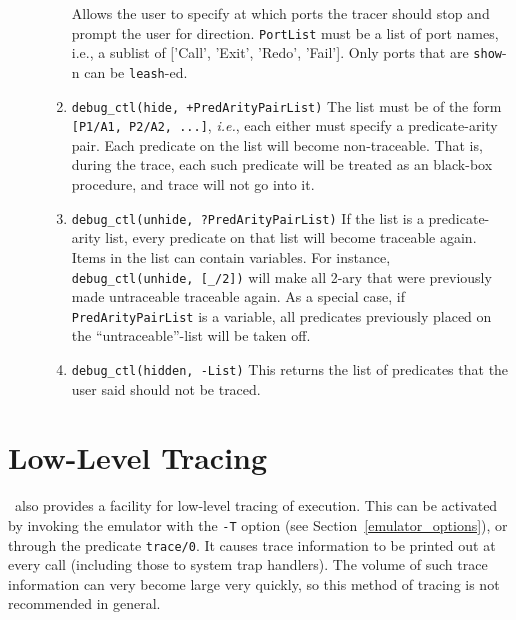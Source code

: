 \begin{description}
\begin{enumerate}
      Allows the user to specify at which ports the tracer should stop
      and prompt the user for direction.  {\tt PortList} must be a list of
      port names, i.e., a sublist of ['Call', 'Exit', 'Redo', 'Fail'].  Only
      ports that are {\tt show}-n can be {\tt leash}-ed. 
    \item {\tt debug\_ctl(hide, +PredArityPairList)}  
      The list must be of the form {\tt [P1/A1, P2/A2, ...]}, {\it i.e.},
      each either must specify a predicate-arity pair. Each predicate on
      the list will become non-traceable. That is, during the trace, each
      such predicate will be treated as an black-box procedure, and trace
      will not go into it.
    \item {\tt debug\_ctl(unhide, ?PredArityPairList)} If the list is a
      predicate-arity list, every predicate on that list will become
      traceable again. Items in the list can contain variables. For
      instance, {\tt debug\_ctl(unhide, [\_/2])} will make all 2-ary that
      were previously made untraceable traceable again.  As a special case,
      if {\tt PredArityPairList} is a variable, all predicates previously
      placed on the ``untraceable''-list will be taken off.
    \item {\tt debug\_ctl(hidden, -List)}
      This returns the list of predicates that the user said should not be
      traced.
   \end{enumerate}
\end{description}


\section{Low-Level Tracing}
 

\ourprolog\ also provides a facility for low-level tracing of execution.
This can be activated by invoking the emulator with the {\tt -T} option
(see Section~\ref{emulator_options}), or through the predicate {\tt trace/0}.
It causes trace information to be printed out at every call (including
those to system trap handlers).  The volume of such trace information
can very become large very quickly, so this method of tracing is not
recommended in general.

